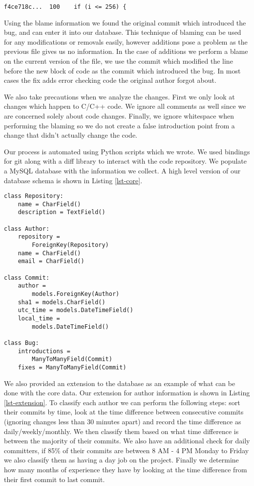 \begin{lstlisting}[caption=Blame of the previous version,label=lst-blame,frame=single]
f4ce718c...  100    if (i <= 256) {
\end{lstlisting}

Using the blame information we found the original commit which
introduced the bug, and can enter it into our database. This
technique of blaming can be used for any modifications or removals
easily, however additions pose a problem as the previous file gives us
no information. In the case of additions we perform a blame on the
current version of the file, we use the commit which modified the line
before the new block of code as the commit which introduced the
bug. In most cases the fix adds error checking code the original
author forgot about.

We also take precautions when we analyze the changes. First we only
look at changes which happen to C/C++ code. We ignore all comments as
well since we are concerned solely about code changes. Finally, we
ignore whitespace when performing the blaming so we do not create a
false introduction point from a change that didn't actually change the
code.

Our process is automated using Python scripts which we wrote. We used
bindings for git along with a diff library to interact with the code
repository. We populate a MySQL database with the information we
collect. A high level version of our database schema is shown in
Listing \ref{lst-core}.

\begin{lstlisting}[caption=Core database schema,label=lst-core,frame=single]
class Repository:
    name = CharField()
    description = TextField()

class Author:
    repository = 
        ForeignKey(Repository)
    name = CharField()
    email = CharField()

class Commit:
    author =
        models.ForeignKey(Author)
    sha1 = models.CharField()
    utc_time = models.DateTimeField()
    local_time =
        models.DateTimeField()

class Bug:
    introductions =
        ManyToManyField(Commit)
    fixes = ManyToManyField(Commit)    
\end{lstlisting}

We also provided an extension to the database as an example of what
can be done with the core data. Our extension for author information
is shown in Listing \ref{lst-extension}. To classify each author we
can perform the following steps: sort their commits by time, look at
the time difference between consecutive commits (ignoring changes less
than 30 minutes apart) and record the time difference as
daily/weekly/monthly. We then classify them based on what time
difference is between the majority of their commits. We also have an
additional check for daily committers, if 85\% of their commits are
between 8 AM - 4 PM Monday to Friday we also classify them as having a
day job on the project. Finally we determine how many months of
experience they have by looking at the time difference from their
first commit to last commit.

